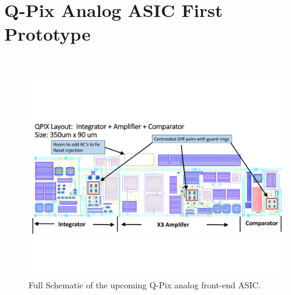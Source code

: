 \documentclass[12pt]{uh_thesis}
\begin{document}
\chapter{Q-Pix Analog ASIC First Prototype}~\label{app:analog_prototype}
\begin{figure}[]
\centering
\includegraphics[width=\textwidth]{images/upcoming_qpix_ASIC.pdf}
\caption{Full Schematic of the upcoming Q-Pix analog front-end ASIC.}
\end{figure}

\printindex
\end{document}
